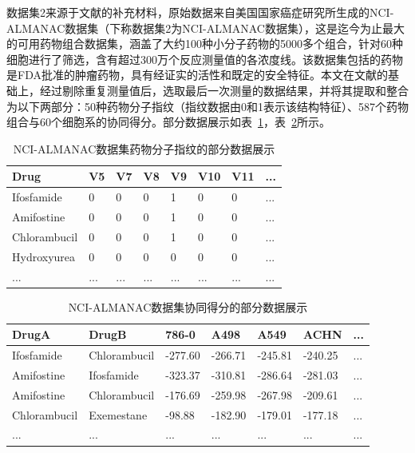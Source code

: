 数据集2来源于文献\cite{18}的补充材料，原始数据来自美国国家癌症研究所生成的NCI-ALMANAC数据集（下称数据集2为NCI-ALMANAC数据集），这是迄今为止最大的可用药物组合数据集，涵盖了大约100种小分子药物的5000多个组合，针对60种细胞进行了筛选，含有超过300万个反应测量值的各浓度线。该数据集包括的药物是FDA批准的肿瘤药物，具有经证实的活性和既定的安全特征。本文在文献\cite{18}的基础上，经过剔除重复测量值后，选取最后一次测量的数据结果，并将其提取和整合为以下两部分：50种药物分子指纹（指纹数据由0和1表示该结构特征）、587个药物组合与60个细胞系的协同得分。部分数据展示如表~\ref{tb:ndd}，表~\ref{tb:ns}所示。


\begin{table}[htbp]
\centering
\caption{NCI-ALMANAC数据集药物分子指纹的部分数据展示\label{tb:ndd}}
\small
\begin{tabular}{p{2.5cm} p{1.2cm} p{1.2cm} p{1.2cm} p{1.2cm} p{1.2cm} p{1.2cm} p{1.2cm}}
\toprule
Drug & V5 & V7 & V8 & V9 & V10 & V11 & ... \\
\midrule
Ifosfamide & 0 & 0 & 0 & 1 & 0 & 0 & ... \\
Amifostine & 0 & 0 & 0 & 1 & 0 & 0 & ... \\
Chlorambucil & 0 & 0 & 0 & 1 & 0 & 0 & ... \\
Hydroxyurea & 0 & 0 & 0 & 0 & 0 & 0 & ... \\
... & ... & ... & ... & ... & ... & ... & ... \\
\bottomrule
\end{tabular}
\end{table}

\begin{table}[htbp]
\centering
\caption{NCI-ALMANAC数据集协同得分的部分数据展示\label{tb:ns}}
\small
\begin{tabular}{p{2.5cm} p{2.5cm} p{1.4cm} p{1.4cm} p{1.4cm} p{1.4cm} p{0.5cm}}
\toprule
DrugA & DrugB & 786-0 & A498 & A549 & ACHN & ... \\
\midrule
Ifosfamide & Chlorambucil & -277.60 & -266.71 & -245.81 & -240.25 & ... \\
Amifostine & Ifosfamide & -323.37 & -310.81 & -286.64 & -281.03 & ... \\
Amifostine & Chlorambucil & -176.69 & -259.98 & -267.98 & -209.61 & ... \\
Chlorambucil & Exemestane & -98.88 & -182.90 & -179.01 & -177.18 & ... \\
... & ... & ... & ... & ... & ... & ... \\
\bottomrule
\end{tabular}
\end{table}

